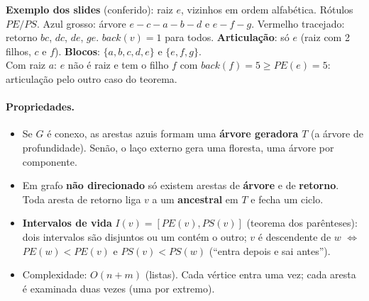 \begin{center}
\qquad
\begin{minipage}[b]{0.52\linewidth}\small
\textbf{Exemplo dos slides} (conferido): raiz $e$, vizinhos em ordem alfabética. Rótulos $PE/PS$. Azul grosso: árvore $e\!-\!c\!-\!a\!-\!b\!-\!d$ e $e\!-\!f\!-\!g$. Vermelho tracejado: retorno $bc$, $dc$, $de$, $ge$.
$back(v)=1$ para todos. \textbf{Articulação}: só $e$ (raiz com 2 filhos, $c$ e $f$). \textbf{Blocos}: $\{a,b,c,d,e\}$ e $\{e,f,g\}$.\\[2pt]
Com raiz $a$: $e$ não é raiz e tem o filho $f$ com $back(f)=5\ge PE(e)=5$: articulação pelo outro caso do teorema.
\end{minipage}
\end{center}

\paragraph{Propriedades.}
\begin{itemize}
  \item Se $G$ é conexo, as arestas azuis formam uma \textbf{árvore geradora} $T$ (a árvore de profundidade). Senão, o laço externo gera uma floresta, uma árvore por componente.
  \item Em grafo \textbf{não direcionado} só existem arestas de \textbf{árvore} e de \textbf{retorno}. Toda aresta de retorno liga $v$ a um \textbf{ancestral} em $T$ e fecha um ciclo.
  \item \textbf{Intervalos de vida} $I(v)=[PE(v),PS(v)]$ (teorema dos parênteses): dois intervalos são disjuntos ou um contém o outro; $v$ é descendente de $w$ $\iff$ $PE(w)<PE(v)$ e $PS(v)<PS(w)$ (``entra depois e sai antes'').
  \item Complexidade: $O(n+m)$ (listas). Cada vértice entra uma vez; cada aresta é examinada duas vezes (uma por extremo).
\end{itemize}

